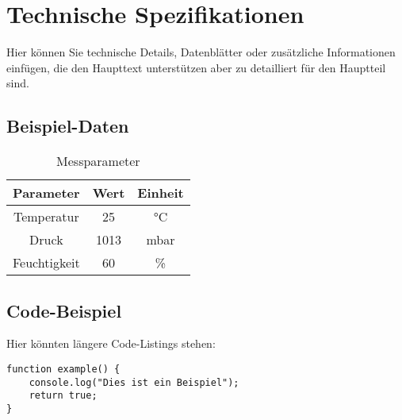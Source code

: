 
\section{Technische Spezifikationen} \label{app:technical}

Hier können Sie technische Details, Datenblätter oder zusätzliche Informationen einfügen, die den Haupttext unterstützen aber zu detailliert für den Hauptteil sind.

\subsection{Beispiel-Daten}
\begin{table}[h!]
\centering
\begin{tabular}{|c|c|c|}
\hline
Parameter & Wert & Einheit \\
\hline
Temperatur & 25 & °C \\
Druck & 1013 & mbar \\
Feuchtigkeit & 60 & \% \\
\hline
\end{tabular}
\caption{Messparameter}
\label{tab:messparameter}
\end{table}

\subsection{Code-Beispiel}
Hier könnten längere Code-Listings stehen:

\begin{verbatim}
function example() {
    console.log("Dies ist ein Beispiel");
    return true;
}
\end{verbatim}